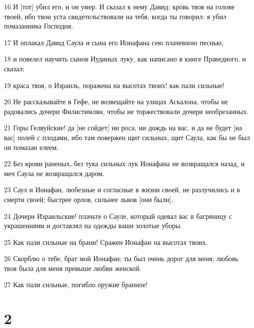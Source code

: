 \par 16 И [тот] убил его, и он умер. И сказал к нему Давид: кровь твоя на голове твоей, ибо твои уста свидетельствовали на тебя, когда ты говорил: я убил помазанника Господня.
\par 17 И оплакал Давид Саула и сына его Ионафана сею плачевною песнью,
\par 18 и повелел научить сынов Иудиных луку, как написано в книге Праведного, и сказал:
\par 19 краса твоя, о Израиль, поражена на высотах твоих! как пали сильные!
\par 20 Не рассказывайте в Гефе, не возвещайте на улицах Аскалона, чтобы не радовались дочери Филистимлян, чтобы не торжествовали дочери необрезанных.
\par 21 Горы Гелвуйские! да [не сойдет] ни роса, ни дождь на вас, и да не будет [на вас] полей с плодами, ибо там повержен щит сильных, щит Саула, как бы не был он помазан елеем.
\par 22 Без крови раненых, без тука сильных лук Ионафана не возвращался назад, и меч Саула не возвращался даром.
\par 23 Саул и Ионафан, любезные и согласные в жизни своей, не разлучились и в смерти своей; быстрее орлов, сильнее львов [они были].
\par 24 Дочери Израильские! плачьте о Сауле, который одевал вас в багряницу с украшениями и доставлял на одежды ваши золотые уборы.
\par 25 Как пали сильные на брани! Сражен Ионафан на высотах твоих.
\par 26 Скорблю о тебе, брат мой Ионафан; ты был очень дорог для меня; любовь твоя была для меня превыше любви женской.
\par 27 Как пали сильные, погибло оружие бранное!

\chapter{2}


